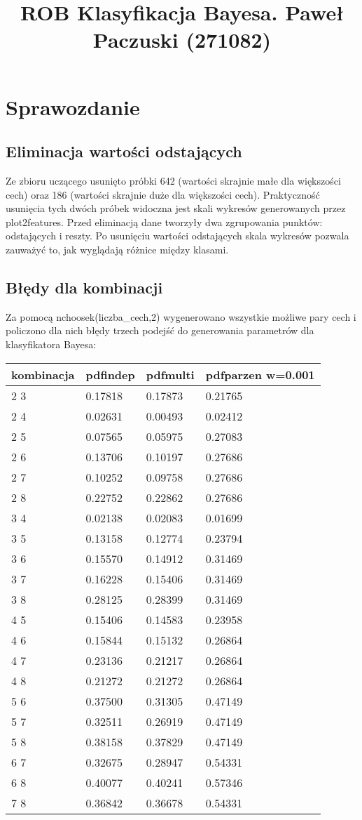 \documentclass[11pt]{article}
\title{ROB Klasyfikacja Bayesa. Paweł Paczuski (271082)}
\begin{document}
    
    
    \maketitle
    
    

    
    \section{Sprawozdanie}\label{rob-klasyfikacja-bayesa-paweux142-paczuski-271028}

    \subsection{Eliminacja wartości
odstających}\label{eliminacja-wartoux15bci-odstajux105cych}

Ze zbioru uczącego usunięto próbki 642 (wartości skrajnie małe dla
większości cech) oraz 186 (wartości skrajnie duże dla większości cech).
Praktyczność usunięcia tych dwóch próbek widoczna jest skali wykresów
generowanych przez plot2features. Przed eliminacją dane tworzyły dwa
zgrupowania punktów: odstających i reszty. Po usunięciu wartości
odstających skala wykresów pozwala zauważyć to, jak wyglądają różnice
między klasami.

\subsection{Błędy dla kombinacji}\label{bux142ux119dy-dla-kombinacji}

Za pomocą nchoosek(liczba\_cech,2) wygenerowano wszystkie możliwe pary
cech i policzono dla nich błędy trzech podejść do generowania parametrów
dla klasyfikatora Bayesa:

\begin{longtable}[]{@{}llll@{}}
\toprule
kombinacja & pdfindep & pdfmulti & pdfparzen w=0.001\tabularnewline
\midrule
\endhead
2 3 & 0.17818 & 0.17873 & 0.21765\tabularnewline
2 4 & 0.02631 & 0.00493 & 0.02412\tabularnewline
2 5 & 0.07565 & 0.05975 & 0.27083\tabularnewline
2 6 & 0.13706 & 0.10197 & 0.27686\tabularnewline
2 7 & 0.10252 & 0.09758 & 0.27686\tabularnewline
2 8 & 0.22752 & 0.22862 & 0.27686\tabularnewline
3 4 & 0.02138 & 0.02083 & 0.01699\tabularnewline
3 5 & 0.13158 & 0.12774 & 0.23794\tabularnewline
3 6 & 0.15570 & 0.14912 & 0.31469\tabularnewline
3 7 & 0.16228 & 0.15406 & 0.31469\tabularnewline
3 8 & 0.28125 & 0.28399 & 0.31469\tabularnewline
4 5 & 0.15406 & 0.14583 & 0.23958\tabularnewline
4 6 & 0.15844 & 0.15132 & 0.26864\tabularnewline
4 7 & 0.23136 & 0.21217 & 0.26864\tabularnewline
4 8 & 0.21272 & 0.21272 & 0.26864\tabularnewline
5 6 & 0.37500 & 0.31305 & 0.47149\tabularnewline
5 7 & 0.32511 & 0.26919 & 0.47149\tabularnewline
5 8 & 0.38158 & 0.37829 & 0.47149\tabularnewline
6 7 & 0.32675 & 0.28947 & 0.54331\tabularnewline
6 8 & 0.40077 & 0.40241 & 0.57346\tabularnewline
7 8 & 0.36842 & 0.36678 & 0.54331\tabularnewline
\bottomrule
\end{longtable}
\end{document}
